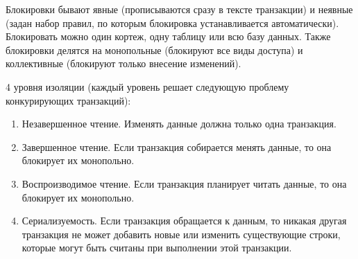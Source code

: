 Блокировки бывают явные (прописываются сразу в тексте транзакции) и неявные
(задан набор правил, по которым блокировка устанавливается автоматически).
Блокировать можно один кортеж, одну таблицу или всю базу данных. Также
блокировки делятся на монопольные (блокируют все виды доступа) и коллективные
(блокируют только внесение изменений).

4 уровня изоляции (каждый уровень решает следующую проблему конкурирующих
транзакций):

\begin{enumerate}
\item
  Незавершенное чтение. Изменять данные должна только одна транзакция.  

\item
  Завершенное чтение. Если транзакция собирается менять данные, то она блокирует
  их монопольно.

\item
  Воспроизводимое чтение. Если транзакция планирует читать  данные, то она
  блокирует их монопольно.

\item
  Сериализуемость. Если транзакция обращается к данным, то никакая другая
  транзакция не может добавить новые или изменить существующие строки, которые
  могут быть считаны при выполнении этой транзакции.
\end{enumerate}